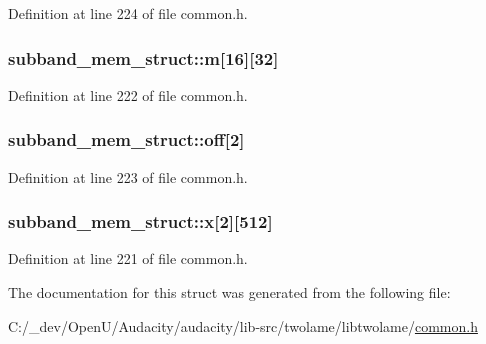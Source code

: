 Definition at line 224 of file common.\+h.

\subsubsection[{\texorpdfstring{m}{m}}]{ subband\+\_\+mem\+\_\+struct\+::m\mbox{[}16\mbox{]}\mbox{[}32\mbox{]}}\hypertarget{structsubband__mem__struct_a7fcc6bbca3e1e6f301c5b790e2ad60bb}{}\label{structsubband__mem__struct_a7fcc6bbca3e1e6f301c5b790e2ad60bb}


Definition at line 222 of file common.\+h.

\subsubsection[{\texorpdfstring{off}{off}}]{ subband\+\_\+mem\+\_\+struct\+::off\mbox{[}2\mbox{]}}\hypertarget{structsubband__mem__struct_af474759ad43b96ba7af66a985de4e7c9}{}\label{structsubband__mem__struct_af474759ad43b96ba7af66a985de4e7c9}


Definition at line 223 of file common.\+h.

\subsubsection[{\texorpdfstring{x}{x}}]{ subband\+\_\+mem\+\_\+struct\+::x\mbox{[}2\mbox{]}\mbox{[}512\mbox{]}}\hypertarget{structsubband__mem__struct_ac17a1e96743f74198a3163771a8e8994}{}\label{structsubband__mem__struct_ac17a1e96743f74198a3163771a8e8994}


Definition at line 221 of file common.\+h.



The documentation for this struct was generated from the following file\+:\begin{DoxyCompactItemize}
\item 
C\+:/\+\_\+dev/\+Open\+U/\+Audacity/audacity/lib-\/src/twolame/libtwolame/\hyperlink{twolame_2libtwolame_2common_8h}{common.\+h}\end{DoxyCompactItemize}
